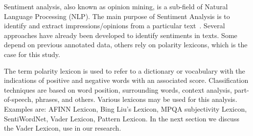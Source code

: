 Sentiment analysis, also known as opinion mining, is a sub-field of Natural Language Processing (NLP). 
The main purpose of Sentiment Analysis is to identify and extract impressions/opinions from a particular text~\cite{vader}. Several approaches have already been developed to identify sentiments in texts. Some depend on previous annotated data, others rely on polarity lexicons, which is the case for this study. 


The term polarity lexicon is used to refer to a dictionary or vocabulary with the indications of positive and negative words with an associated score.  Classification techniques are based on word position, surrounding words, context analysis, part-of-speech, phrases, and others. Various lexicons may be used for this analysis.  Examples are: AFINN Lexicon\cite{afinn}, Bing Liu's Lexicon\cite{Jinda}, MPQA subjectivity Lexicon\cite{Wilson}, SentiWordNet\cite{esuli-sentiwordnet}\cite{baccianella-sentiwordnet}, Vader Lexicon\cite{vader}, Pattern Lexicon\cite{pattern}. In the next section we discuss the Vader Lexicon, use in our research. %

